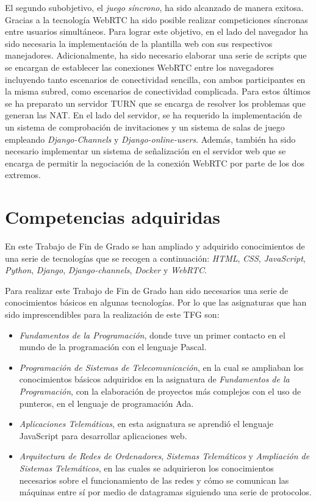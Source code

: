 \documentclass[a4paper, 12pt]{book}
\begin{document}
El segundo subobjetivo, el \emph{juego síncrono}, ha sido alcanzado de manera exitosa. Gracias a la tecnología WebRTC ha sido posible realizar competiciones síncronas entre usuarios simultáneos. Para lograr este objetivo, en el lado del navegador ha sido necesaria la implementación de la plantilla web con sus respectivos manejadores. Adicionalmente, ha sido necesario elaborar una serie de scripts que se encargan de establecer las conexiones WebRTC entre los navegadores incluyendo tanto escenarios de conectividad sencilla, con ambos participantes en la misma subred, como escenarios de conectividad complicada. Para estos últimos se ha preparato un servidor TURN que se encarga de resolver los problemas que generan las NAT. En el lado del servidor, se ha requerido la implementación de un sistema de comprobación de invitaciones y un sistema de salas de juego empleando \emph{Django-Channels} y \emph{Django-online-users}. Además, también ha sido necesario implementar un sistema de señalización en el servidor web que se encarga de permitir la negociación de la conexión WebRTC por parte de los dos extremos.
\section{Competencias adquiridas}
\label{sec:lecciones_aprendidas}

En este Trabajo de Fin de Grado se han ampliado y adquirido conocimientos de una serie de tecnologías que se recogen a continuación: \emph{HTML}, \emph{CSS}, \emph{JavaScript}, \emph{Python}, \emph{Django}, \emph{Django-channels}, \emph{Docker} y \emph{WebRTC}.

Para realizar este Trabajo de Fin de Grado han sido necesarios una serie de conocimientos básicos en algunas tecnologías. Por lo que las asignaturas que han sido imprescendibles para la realización de este TFG son:

\begin{itemize}
\item \emph{Fundamentos de la Programación}, donde tuve un primer contacto en el mundo de la programación con el lenguaje Pascal.
\item \emph{Programación de Sistemas de Telecomunicación}, en la cual se ampliaban los conocimientos básicos adquiridos en la asignatura de \emph{Fundamentos de la Programación}, con la elaboración de proyectos más complejos con el uso de punteros, en el lenguaje de programación Ada.
\item \emph{Aplicaciones Telemáticas}, en esta asignatura se aprendió el lenguaje JavaScript para desarrollar aplicaciones web.
\item \emph{Arquitectura de Redes de Ordenadores}, \emph{Sistemas Telemáticos} y \emph{Ampliación de Sistemas Telemáticos}, en las cuales se adquirieron los conocimientos necesarios sobre el funcionamiento de las redes y cómo se comunican las máquinas entre sí por medio de datagramas siguiendo una serie de protocolos.
\end{itemize}
\end{document}
